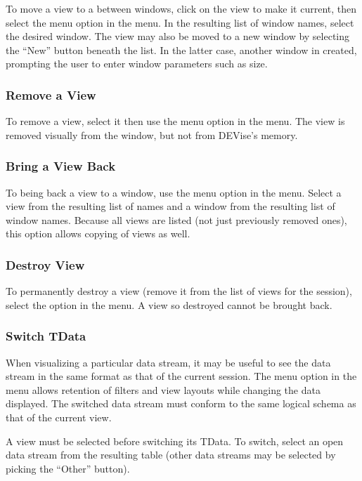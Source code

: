 To move a view to a between windows, click on the view to make it current, then
select the  menu option in the  menu. In the
resulting list of window names, select the desired window. The view may also be
moved to a new window by selecting the ``New'' button beneath the list. In the
latter case, another window in created, prompting the user to enter window
parameters such as size.

\subsubsection{Remove a View}

To remove a view, select it then use the  menu option in the
 menu. The view is removed visually from the window, but not from
DEVise's memory.

\subsubsection{Bring a View Back}

To being back a view to a window, use the  menu option in
the  menu. Select a view from the resulting list of names and a
window from the resulting list of window names. Because all views are listed
(not just previously removed ones), this option allows copying of views as well.

\subsubsection{Destroy View}

To permanently destroy a view (remove it from the list of views for the
session), select the  option in the  menu. A view
so destroyed cannot be brought back.

\subsubsection{Switch TData}

When visualizing a particular data stream, it may be useful to see the data
stream in the same format as that of the current session. The  menu option in the  menu allows retention of filters and
view layouts while changing the data displayed. The switched data stream must
conform to the same logical schema as that of the current view.

A view must be selected before switching its TData. To switch, select an open
data stream from the resulting table (other data streams may be selected by
picking the ``Other'' button).

